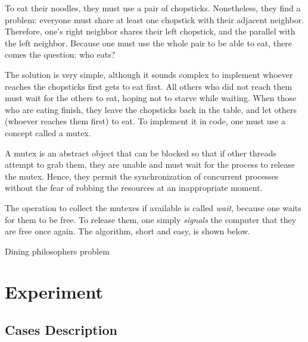 \documentclass[12pt]{article}
\begin{document}
To eat their noodles, they must use a pair of chopsticks. Nonetheless, they find a problem: everyone must share at least one chopstick with their adjacent neighbor. Therefore, one’s right neighbor shares their left chopstick, and the parallel with the left neighbor. Because one must use the whole pair to be able to eat, there comes the question: who eats?

The solution is very simple, although it sounds complex to implement whoever reaches the chopsticks first gets to eat first. All others who did not reach them must wait for the others to eat, hoping not to starve while waiting. When those who are eating finish, they leave the chopsticks back in the table, and let others (whoever reaches them first) to eat. To implement it in code, one must use a concept called a mutex.

A mutex is an abstract object that can be blocked so that if other threads attempt to grab them, they are unable and must wait for the process to release the mutex. Hence, they permit the synchronization of concurrent processes without the fear of robbing the resources at an inappropriate moment.

The operation to collect the mutexes if available is called \emph{wait}, because one waits for them to be free. To release them, one simply \emph{signals} the computer that they are free once again. The algorithm, short and easy, is shown below.

\begin{algorithm}[H]
\SetAlgoLined
{}
\caption{Dining philosophers problem}
\end{algorithm}

\section{Experiment}

\subsection{Cases Description}
\end{document}

